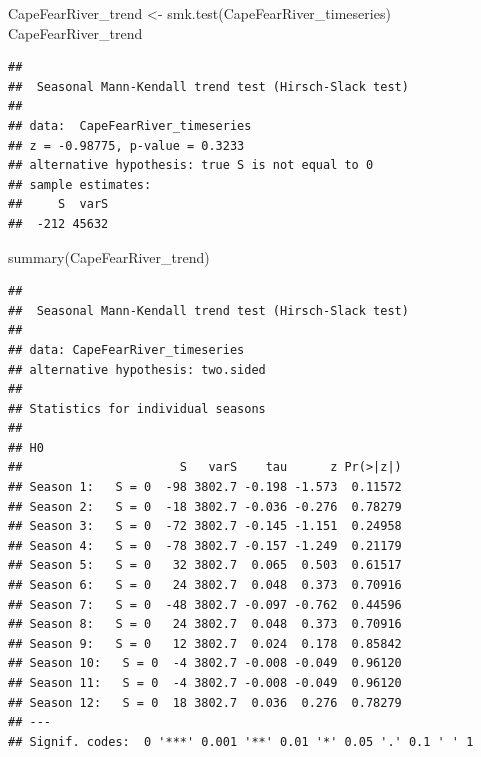 \documentclass[
  12pt,
]{article}
\newenvironment{Shaded}{\begin{snugshade}}{\end{snugshade}}
\newcommand{\FunctionTok}[1]{\textcolor[rgb]{0.00,0.00,0.00}{#1}}
\newcommand{\NormalTok}[1]{#1}
\newcommand{\OtherTok}[1]{\textcolor[rgb]{0.56,0.35,0.01}{#1}}
\begin{document}
\begin{Shaded}
\begin{Highlighting}[]
\NormalTok{CapeFearRiver\_trend }\OtherTok{\textless{}{-}} \FunctionTok{smk.test}\NormalTok{(CapeFearRiver\_timeseries)}
\NormalTok{CapeFearRiver\_trend}
\end{Highlighting}
\end{Shaded}

\begin{verbatim}
## 
##  Seasonal Mann-Kendall trend test (Hirsch-Slack test)
## 
## data:  CapeFearRiver_timeseries
## z = -0.98775, p-value = 0.3233
## alternative hypothesis: true S is not equal to 0
## sample estimates:
##     S  varS 
##  -212 45632
\end{verbatim}

\begin{Shaded}
\begin{Highlighting}[]
\FunctionTok{summary}\NormalTok{(CapeFearRiver\_trend)}
\end{Highlighting}
\end{Shaded}

\begin{verbatim}
## 
##  Seasonal Mann-Kendall trend test (Hirsch-Slack test)
## 
## data: CapeFearRiver_timeseries
## alternative hypothesis: two.sided
## 
## Statistics for individual seasons
## 
## H0
##                      S   varS    tau      z Pr(>|z|)  
## Season 1:   S = 0  -98 3802.7 -0.198 -1.573  0.11572  
## Season 2:   S = 0  -18 3802.7 -0.036 -0.276  0.78279  
## Season 3:   S = 0  -72 3802.7 -0.145 -1.151  0.24958  
## Season 4:   S = 0  -78 3802.7 -0.157 -1.249  0.21179  
## Season 5:   S = 0   32 3802.7  0.065  0.503  0.61517  
## Season 6:   S = 0   24 3802.7  0.048  0.373  0.70916  
## Season 7:   S = 0  -48 3802.7 -0.097 -0.762  0.44596  
## Season 8:   S = 0   24 3802.7  0.048  0.373  0.70916  
## Season 9:   S = 0   12 3802.7  0.024  0.178  0.85842  
## Season 10:   S = 0  -4 3802.7 -0.008 -0.049  0.96120  
## Season 11:   S = 0  -4 3802.7 -0.008 -0.049  0.96120  
## Season 12:   S = 0  18 3802.7  0.036  0.276  0.78279  
## ---
## Signif. codes:  0 '***' 0.001 '**' 0.01 '*' 0.05 '.' 0.1 ' ' 1
\end{verbatim}
\end{document}
